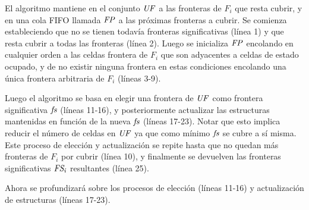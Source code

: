 
El algoritmo mantiene en el conjunto $\mathit{UF}$ a las fronteras de $F_i$ que
resta cubrir, y en una cola FIFO llamada $\mathit{FP}$ a las próximas fronteras a
cubrir. Se comienza estableciendo que no se tienen todavía fronteras
significativas (línea 1) y  que resta cubrir a todas las fronteras (línea 2).
Luego se inicializa $\mathit{FP}$ encolando en cualquier orden a las celdas
frontera de $F_i$ que son adyacentes a celdas de estado ocupado, y de no
existir ninguna frontera en estas condiciones encolando una única frontera
arbitraria de $F_i$ (líneas 3-9). 

Luego el algoritmo se basa en elegir una frontera de $\mathit{UF}$ como frontera
significativa $\mathit{fs}$ (líneas 11-16), y posteriormente actualizar las
estructuras mantenidas en función de la nueva $\mathit{fs}$ (líneas 17-23). Notar
que esto implica reducir el número de celdas en $\mathit{UF}$ ya que como mínimo
$\mathit{fs}$ se cubre a sí misma. Este proceso de elección y actualización se
repite hasta que no quedan más fronteras de $F_i$ por cubrir (línea 10),
y finalmente se devuelven las fronteras significativas $\mathit{FS_i}$ resultantes
(línea 25).
 
Ahora se profundizará sobre los procesos de elección (líneas 11-16) y
actualización de estructuras (líneas 17-23).


